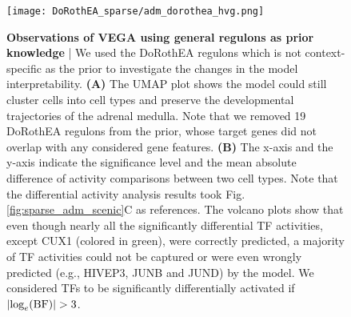 \begin{figure}[h!]
    \centering
    \hspace*{-5mm}
    \texttt{[image: DoRothEA\_sparse/adm\_dorothea\_hvg.png]}
    \caption{\small{\textbf{Observations of VEGA using general regulons as prior knowledge} | We used the DoRothEA regulons which is not context-specific as the prior to investigate the changes in the model interpretability. \textbf{(A)} The UMAP plot shows the model could still cluster cells into cell types and preserve the developmental trajectories of the adrenal medulla. Note that we removed 19 DoRothEA regulons from the prior, whose target genes did not overlap with any considered gene features. \textbf{(B)} The x-axis and the y-axis indicate the significance level and the mean absolute difference of activity comparisons between two cell types. Note that the differential activity analysis results took Fig.\ref{fig:sparse_adm_scenic}C as references. The volcano plots show that even though nearly all the significantly differential TF activities, except CUX1 (colored in green), were correctly predicted, a majority of TF activities could not be captured or were even wrongly predicted (e.g., HIVEP3, JUNB and JUND) by the model. We considered TFs to be significantly differentially activated if $|\textnormal{log}_e(\textnormal{BF})|>3$.}}
    \label{fig:sparse_adm_dorothea_hvg}
\end{figure}

